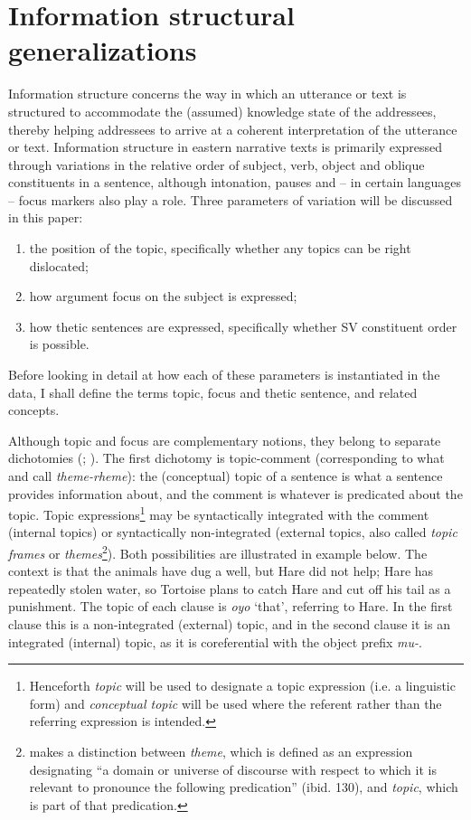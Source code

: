 \documentclass[output=paper]{langsci/langscibook}
\begin{document}
\section{Information structural generalizations}\label{§2:information.nicolle}

Information structure concerns the way in which an utterance or text is structured to accommodate the (assumed) knowledge state of the addressees, thereby helping addressees to arrive at a coherent interpretation of the utterance or text. Information structure in eastern  narrative texts is primarily expressed through variations in the relative order of subject, verb, object and oblique constituents in a sentence, although intonation, pauses and -- in certain languages -- focus markers also play a role. Three parameters of variation will be discussed in this paper:

\begin{enumerate}
\item the position of the topic, specifically whether any topics can be right dislocated;
\item how argument focus on the subject is expressed;
\item how thetic sentences are expressed, specifically whether SV constituent order is possible.
\end{enumerate}

Before looking in detail at how each of these parameters is instantiated in the data, I shall define the terms topic, focus and thetic sentence, and related concepts.

Although topic and focus are complementary notions, they belong to separate dichotomies (\citealt[66]{decat2007}; \citealt[42]{erteschikshir2007}). The first dichotomy is topic-comment (corresponding to what \citet{halliday1967} and \citet{dik1981,dik1989} call \textit{theme-rheme}): the (conceptual) topic of a sentence is what a sentence provides information about, and the comment is whatever is predicated about the topic. Topic expressions\footnote{Henceforth \textit{topic} will be used to designate a topic expression (i.e. a linguistic form) and \textit{conceptual topic} will be used where the referent rather than the referring expression is intended.} may be syntactically integrated with the comment (internal topics) or syntactically non-integrated (external topics, also called \textit{topic frames} or \textit{themes}\footnote{\citet[129--144]{dik1981} makes a distinction between \textit{theme}, which is defined as an expression designating “a domain or universe of discourse with respect to which it is relevant to pronounce the following predication” (ibid. 130), and \textit{topic}, which is part of that predication.}). Both possibilities are illustrated in example  below. The context is that the animals have dug a well, but Hare did not help; Hare has repeatedly stolen water, so Tortoise plans to catch Hare and cut off his tail as a punishment. The topic of each clause is  \textit{oyo} ‘that’, referring to Hare. In the first clause this is a non-integrated (external) topic, and in the second clause it is an integrated (internal) topic, as it is coreferential with the object prefix \textit{mu-}.
\end{document}
